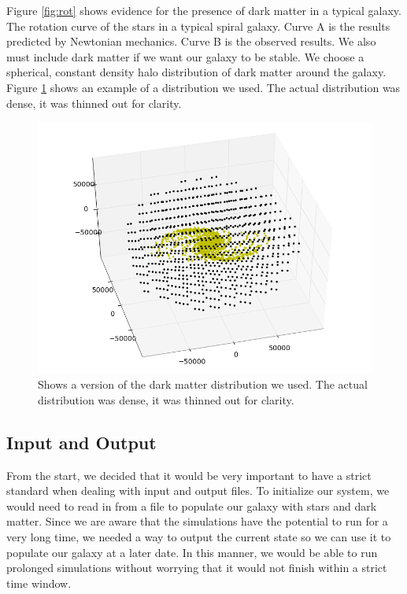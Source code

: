 \documentclass{article}
\begin{document}
Figure \ref{fig:rot} shows evidence for the presence of dark matter in a typical galaxy. The rotation curve of the stars in a typical spiral galaxy. Curve A is the results predicted by Newtonian mechanics. Curve B is the observed results. We also must include dark matter if we want our galaxy to be stable. We choose a spherical, constant density halo distribution of dark matter around the galaxy. Figure \ref{fig:dark} shows an example of a distribution we used. The actual distribution was dense, it was thinned out for clarity.

\begin{figure}[Ht!]
 \centering
 \includegraphics[width=\textwidth]{./darkmatterdist.png}
  \caption{Shows a version of the dark matter distribution we used. The actual distribution was dense, it was thinned out for clarity. } 
 \label{fig:dark}
\end{figure}

\subsection{Input and Output}
\label{subsec:io}

From the start, we decided that it would be very important to have a strict standard when dealing with input and output files.  To initialize our system, we would need to read in from a file to populate our galaxy with stars and dark matter.  Since we are aware that the simulations have the potential to run for a very long time, we needed a way to output the current state so we can use it to populate our galaxy at a later date.  In this manner, we would be able to run prolonged simulations without worrying that it would not finish within a strict time window.  
\end{document}

